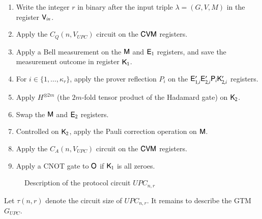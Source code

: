 \begin{center}
\begin{mdframed}
	\begin{enumerate}
		\item Write the integer $r$ in binary after the input triple $\lambda = (G,V,M)$ in the register ${\mathsf{V}}_{in}$.
		\item Apply the $C_Q(n,V_{UPC})$ circuit on the ${\mathsf{C}} {\mathsf{V}} {\mathsf{M}}$ registers.
    \item Apply a Bell measurement on the ${\mathsf{M}}$ and ${\mathsf{E}}_1$ registers, and save the measurement outcome in register ${\mathsf{K}}_1$.
    \item For $i \in \{1,\ldots,\kappa_r\}$, apply the prover reflection $P_i$ on the ${\mathsf{E}}_{1,i}' {\mathsf{E}}_{2,i}' {\mathsf{P}}_i {\mathsf{K}}_{2,i}'$ registers.
    \item Apply $H^{\otimes 2m}$ (the $2m$-fold tensor product of the Hadamard gate) on ${\mathsf{K}}_2$. 
    \item Swap the ${\mathsf{M}}$ and ${\mathsf{E}}_2$ registers.
    \item Controlled on ${\mathsf{K}}_2$, apply the Pauli correction operation on ${\mathsf{M}}$.
    \item Apply the $C_A(n,V_{UPC})$ circuit on the ${\mathsf{C}} {\mathsf{V}} {\mathsf{M}}$ registers.
    \item Apply a CNOT gate to ${\mathsf{O}}$ if ${\mathsf{K}}_1$ is all zeroes.
    \end{enumerate}
\end{mdframed}
\begin{figure}[H]
\caption{Description of the protocol circuit \textsc{$UPC_{n,r}$}}
\label{fig:upc}
\end{figure}
\end{center}







Let $\tau(n,r)$ denote the circuit size of $UPC_{n,r}$. It remains to describe the GTM $G_{UPC}$. 

